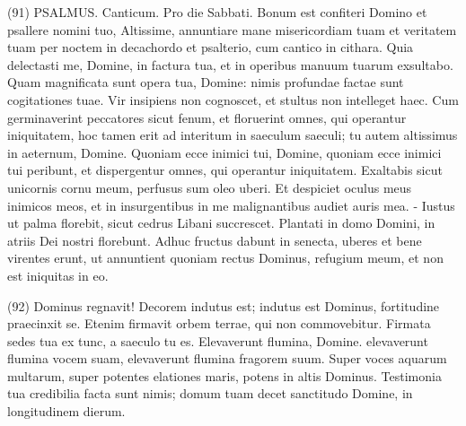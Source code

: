 \begin{biblechapter}  (91) 
\verse  PSALMUS. Canticum. Pro die Sabbati. 
\verse Bonum est confiteri Domino et psallere nomini tuo, Altissime, 
\verse annuntiare mane misericordiam tuam et veritatem tuam per noctem 
\verse in decachordo et psalterio, cum cantico in cithara. 
\verse Quia delectasti me, Domine, in factura tua, et in operibus manuum tuarum exsultabo. 
\verse Quam magnificata sunt opera tua, Domine: nimis profundae factae sunt cogitationes tuae. 
\verse Vir insipiens non cognoscet, et stultus non intelleget haec. 
\verse Cum germinaverint peccatores sicut fenum, et floruerint omnes, qui operantur iniquitatem, hoc tamen erit ad interitum in saeculum saeculi; 
\verse tu autem altissimus in aeternum, Domine. 
\verse Quoniam ecce inimici tui, Domine, quoniam ecce inimici tui peribunt, et dispergentur omnes, qui operantur iniquitatem. 
\verse Exaltabis sicut unicornis cornu meum, perfusus sum oleo uberi. 
\verse Et despiciet oculus meus inimicos meos, et in insurgentibus in me malignantibus audiet auris mea. - 
\verse Iustus ut palma florebit, sicut cedrus Libani succrescet. 
\verse Plantati in domo Domini, in atriis Dei nostri florebunt. 
\verse Adhuc fructus dabunt in senecta, uberes et bene virentes erunt, 
\verse ut annuntient quoniam rectus Dominus, refugium meum, et non est iniquitas in eo. 
\end{biblechapter}

\begin{biblechapter}  (92) 
\verse Dominus regnavit! Decorem indutus est; indutus est Dominus, fortitudine praecinxit se. Etenim firmavit orbem terrae, qui non commovebitur. 
\verse Firmata sedes tua ex tunc, a saeculo tu es. 
\verse Elevaverunt flumina, Domine. elevaverunt flumina vocem suam, elevaverunt flumina fragorem suum. 
\verse Super voces aquarum multarum, super potentes elationes maris, potens in altis Dominus. 
\verse Testimonia tua credibilia facta sunt nimis; domum tuam decet sanctitudo Domine, in longitudinem dierum. 
\end{biblechapter}

